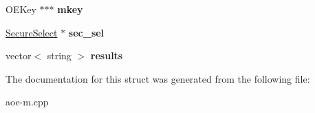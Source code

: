 \begin{DoxyCompactItemize}
\item 
\hypertarget{structthread__data_a4eee52b5c15fed21e5670bd75fdf727d}{O\-E\-Key $\ast$$\ast$$\ast$ {\bfseries mkey}}\label{structthread__data_a4eee52b5c15fed21e5670bd75fdf727d}

\item 
\hypertarget{structthread__data_accb6bab64d9749d50ab0e80f7f65f2fc}{\hyperlink{classSecureSelect}{Secure\-Select} $\ast$ {\bfseries sec\-\_\-sel}}\label{structthread__data_accb6bab64d9749d50ab0e80f7f65f2fc}

\item 
\hypertarget{structthread__data_a85af402928bace8d5b324fa82e6df04d}{vector$<$ string $>$ {\bfseries results}}\label{structthread__data_a85af402928bace8d5b324fa82e6df04d}

\end{DoxyCompactItemize}


The documentation for this struct was generated from the following file\-:\begin{DoxyCompactItemize}
\item 
aoe-\/m.\-cpp\end{DoxyCompactItemize}
